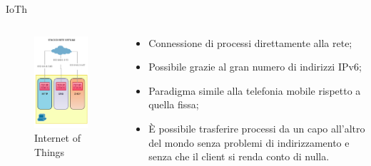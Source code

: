 \documentclass{beamer}
\begin{document}
\begin{frame}[fragile]{IoTh}
	\begin{columns}[T]
	\begin{column}{.40\textwidth}
	    \begin{figure}[t!]
	    \includegraphics[scale=0.35]{img/new_stack.png}
	    \caption{Internet of Things}
	    \centering

	\end{figure}
	\end{column}%
	\hfill%
	\begin{column}{.60\textwidth}
	\newline
	\begin{itemize}
	    \item Connessione di processi direttamente alla rete;\newline
			\item Possibile grazie al gran numero di indirizzi IPv6;\newline
			\item Paradigma simile alla telefonia mobile rispetto a quella fissa;\newline
			\item \`E possibile trasferire processi da un capo all'altro del mondo senza problemi di indirizzamento e senza che il client si renda conto di nulla.\newline
	\end{itemize}

	\end{column}%
	\end{columns}
\end{frame}
\end{document}
